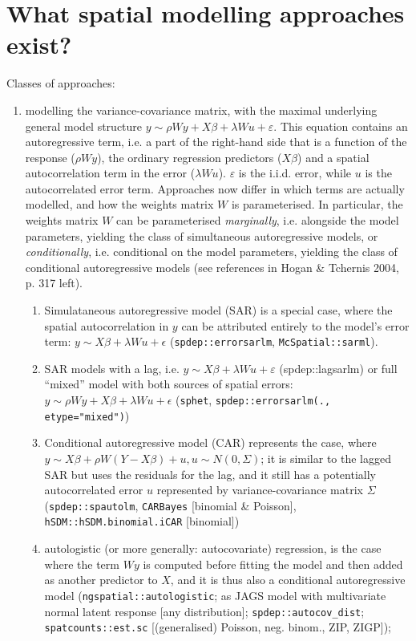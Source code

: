 \documentclass[11pt]{article}
\begin{document}
\section{What spatial modelling approaches exist?}

Classes of approaches:
\begin{enumerate}
\item modelling the variance-covariance matrix, with the maximal underlying general model structure $y \sim \rho W y + X \beta + \lambda W u + \varepsilon$. This equation contains an autoregressive term, i.e. a part of the right-hand side that is a function of the response ($\rho W y$), the ordinary regression predictors ($X\beta$) and a spatial autocorrelation term in the error ($\lambda W u$). $\varepsilon$ is the i.i.d. error, while $u$ is the autocorrelated error term. Approaches now differ in which terms are actually modelled, and how the weights matrix $W$ is parameterised.%
In particular, the weights matrix $W$ can be parameterised \emph{marginally}, i.e. alongside the model parameters, yielding the class of simultaneous autoregressive models, or \emph{conditionally}, i.e. conditional on the model parameters, yielding the class of conditional autoregressive models (see references in Hogan \& Tchernis 2004, p. 317 left).
\begin{enumerate}
	\item Simulataneous autoregressive model (SAR) is a special case, where the spatial autocorrelation in $y$ can be attributed entirely to the model's error term: $y \sim X\beta + \lambda W u + \epsilon$ (\texttt{spdep::errorsarlm}, \texttt{McSpatial::sarml}).
	\item SAR models with a lag, i.e. $y \sim X\beta + \lambda W u + \varepsilon$ (spdep::lagsarlm) or full ``mixed'' model with both sources of spatial errors: $y \sim \rho W y + X\beta + \lambda W u + \epsilon$ (\texttt{sphet}, \texttt{spdep::errorsarlm(., etype="mixed")})
	\item Conditional autoregressive model (CAR) represents the case, where $y \sim X\beta + \rho W (Y - X\beta) + u, u \sim N(0, \Sigma)$; it is similar to the lagged SAR but uses the residuals for the lag, and it still has a potentially autocorrelated error $u$ represented by variance-covariance matrix $\Sigma$ (\texttt{spdep::spautolm}, \texttt{CARBayes} [binomial \& Poisson], \texttt{hSDM::hSDM.binomial.iCAR} [binomial])
	\item autologistic (or more generally: autocovariate) regression, is the case where the term $Wy$ is computed before fitting the model and then added as another predictor to $X$, and it is thus also a conditional autoregressive model (\texttt{ngspatial::autologistic}; as JAGS model with multivariate normal latent response [any distribution]; \texttt{spdep::autocov\_dist}; \texttt{spatcounts::est.sc} [(generalised) Poisson, neg. binom., ZIP, ZIGP]); 

\end{enumerate}
\end{enumerate}
\end{document}
